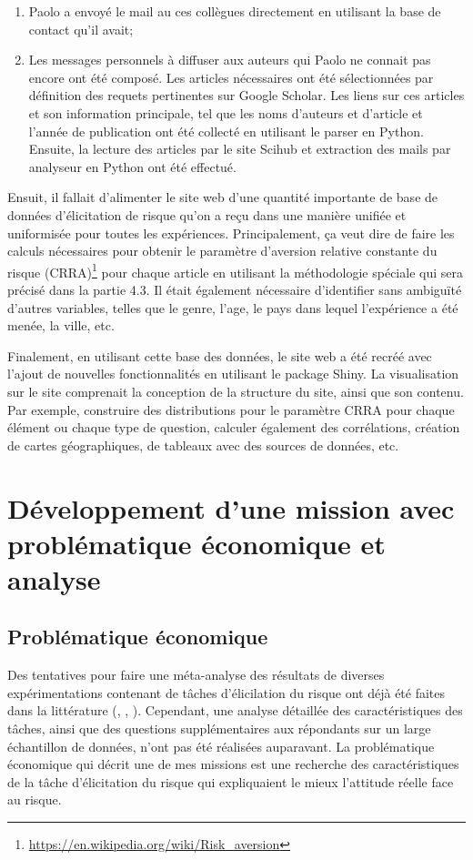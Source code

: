 \documentclass[12pt]{article}
\begin{document}
\begin{enumerate}
\item Paolo a envoyé le mail au ces collègues directement en utilisant la base de contact qu'il avait;
\item Les messages personnels à diffuser aux auteurs qui Paolo ne connait pas encore ont été composé. Les articles nécessaires ont été sélectionnées par définition des requets pertinentes sur Google Scholar. Les liens sur ces articles et son information principale, tel que les noms d'auteurs et d'article et l'année de publication ont été collecté en utilisant le parser en Python. Ensuite, la lecture des articles par le site Scihub et extraction des mails par analyseur en Python ont été effectué. 
\end{enumerate}

Ensuit, il fallait d'alimenter le site web d'une quantité importante de
base de données d'élicitation de risque qu'on a reçu dans une manière
unifiée et uniformisée pour toutes les expériences. Principalement, ça
veut dire de faire les calculs nécessaires pour obtenir le paramètre
d'aversion relative constante du risque (CRRA)\footnote{\url{https://en.wikipedia.org/wiki/Risk_aversion}}
pour chaque article en utilisant la méthodologie spéciale qui sera
précisé dans la partie 4.3. Il était également nécessaire d'identifier
sans ambiguïté d'autres variables, telles que le genre, l'age, le pays
dans lequel l'expérience a été menée, la ville, etc.

Finalement, en utilisant cette base des données, le site web a été
recréé avec l'ajout de nouvelles fonctionnalités en utilisant le package
Shiny. La visualisation sur le site comprenait la conception de la
structure du site, ainsi que son contenu. Par exemple, construire des
distributions pour le paramètre CRRA pour chaque élément ou chaque type
de question, calculer également des corrélations, création de cartes
géographiques, de tableaux avec des sources de données, etc.

\section{Développement d’une mission avec problématique économique et analyse}
\label{sec:fourth}

\subsection{Problématique économique}

Des tentatives pour faire une méta-analyse des résultats de diverses
expérimentations contenant de tâches d'élicilation du risque ont déjà
été faites dans la littérature (\citet{CroFil2013b},
\citet{Alserda2019}, \citet{Bokern2021}). Cependant, une analyse
détaillée des caractéristiques des tâches, ainsi que des questions
supplémentaires aux répondants sur un large échantillon de données,
n'ont pas été réalisées auparavant. La problématique économique qui
décrit une de mes missions est une recherche des caractéristiques de la
tâche d'élicitation du risque qui expliquaient le mieux l'attitude
réelle face au risque.
\end{document}
